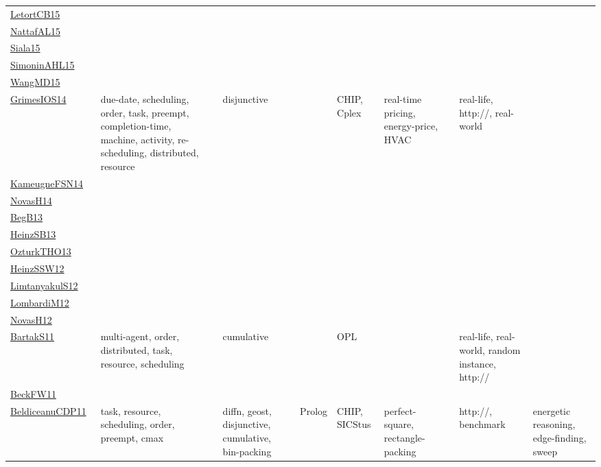 {\begin{longtable}{p{3cm}p{4cm}p{2cm}p{2cm}p{2cm}p{2cm}p{2cm}p{2cm}p{2cm}p{2cm}}
\href{articles/LetortCB15.pdf}{LetortCB15}~\cite{LetortCB15} &  &  &  &  &  &  &  &  & \\
\href{articles/NattafAL15.pdf}{NattafAL15}~\cite{NattafAL15} &  &  &  &  &  &  &  &  & \\
\href{articles/Siala15.pdf}{Siala15}~\cite{Siala15} &  &  &  &  &  &  &  &  & \\
\href{articles/SimoninAHL15.pdf}{SimoninAHL15}~\cite{SimoninAHL15} &  &  &  &  &  &  &  &  & \\
\href{articles/WangMD15.pdf}{WangMD15}~\cite{WangMD15} &  &  &  &  &  &  &  &  & \\
\href{articles/GrimesIOS14.pdf}{GrimesIOS14}~\cite{GrimesIOS14} & due-date, scheduling, order, task, preempt, completion-time, machine, activity, re-scheduling, distributed, resource &  & disjunctive &  & CHIP, Cplex & real-time pricing, energy-price, HVAC &  & real-life, http://, real-world & \\
\href{articles/KameugneFSN14.pdf}{KameugneFSN14}~\cite{KameugneFSN14} &  &  &  &  &  &  &  &  & \\
\href{articles/NovasH14.pdf}{NovasH14}~\cite{NovasH14} &  &  &  &  &  &  &  &  & \\
\href{}{BegB13}~\cite{BegB13} &  &  &  &  &  &  &  &  & \\
\href{articles/HeinzSB13.pdf}{HeinzSB13}~\cite{HeinzSB13} &  &  &  &  &  &  &  &  & \\
\href{articles/OzturkTHO13.pdf}{OzturkTHO13}~\cite{OzturkTHO13} &  &  &  &  &  &  &  &  & \\
\href{articles/HeinzSSW12.pdf}{HeinzSSW12}~\cite{HeinzSSW12} &  &  &  &  &  &  &  &  & \\
\href{articles/LimtanyakulS12.pdf}{LimtanyakulS12}~\cite{LimtanyakulS12} &  &  &  &  &  &  &  &  & \\
\href{articles/LombardiM12.pdf}{LombardiM12}~\cite{LombardiM12} &  &  &  &  &  &  &  &  & \\
\href{articles/NovasH12.pdf}{NovasH12}~\cite{NovasH12} &  &  &  &  &  &  &  &  & \\
\href{articles/BartakS11.pdf}{BartakS11}~\cite{BartakS11} & multi-agent, order, distributed, task, resource, scheduling &  & cumulative &  & OPL &  &  & real-life, real-world, random instance, http:// & \\
\href{}{BeckFW11}~\cite{BeckFW11} &  &  &  &  &  &  &  &  & \\
\href{articles/BeldiceanuCDP11.pdf}{BeldiceanuCDP11}~\cite{BeldiceanuCDP11} & task, resource, scheduling, order, preempt, cmax &  & diffn, geost, disjunctive, cumulative, bin-packing & Prolog & CHIP, SICStus & perfect-square, rectangle-packing &  & http://, benchmark & energetic reasoning, edge-finding, sweep\\

\end{longtable}}
